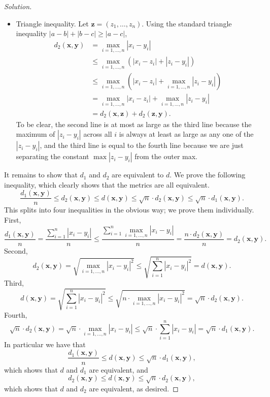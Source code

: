 \documentclass[11pt]{scrartcl}
\providecommand{\ii}{\item}
\theoremstyle{problem}
\theoremstyle{remark}
\newenvironment{soln}{\begin{proof}[Solution]}{\end{proof}}
\begin{document}
\begin{soln}
\begin{itemize}
		\ii Triangle inequality. Let $\mathbf z = (z_1, \dots, z_n)$.
		Using the standard triangle inequality $|a - b| + |b - c| \ge |a - c|$,
		\begin{align*}
			d_2(\mathbf x,\mathbf y) &= \max_{i=1,\dots,n}|x_i - y_i|\\
			&\le \max_{i=1,\dots,n} (|x_i - z_i| + |z_i - y_i|)\\
			&\le \max_{i=1,\dots,n} \left(|x_i - z_i| + \max_{i=1,\dots,n}|z_i - y_i|\right)\\
			&= \max_{i=1,\dots,n} |x_i - z_i|
			+ \max_{i=1,\dots,n}|z_i - y_i|\\
			&= d_2(\mathbf x,\mathbf z) + d_2(\mathbf z,\mathbf y).
		\end{align*}
		To be clear, the second line is at most as large as the third line
		because the maximum of $|z_i - y_i|$ across all $i$
		is always at least as large as any one of the $|z_i - y_i|$,
		and the third line is equal to the fourth line
		because we are just separating the constant $\max |z_i - y_i|$
		from the outer max.
	\end{itemize}

	It remains to show that $d_1$ and $d_2$ are equivalent to $d$.
	We prove the following inequality,
	which clearly shows that the metrics are all equivalent.
	\[
	\frac{d_1(\mathbf x, \mathbf y)}{n} \le
	d_2(\mathbf x, \mathbf y) \le
	d(\mathbf x, \mathbf y) \le
	\sqrt n\cdot d_2(\mathbf x, \mathbf y) \le
	\sqrt n\cdot d_1(\mathbf x, \mathbf y).
	\]
	This splits into four inequalities in the obvious way;
	we prove them individually. First,
	\[\frac{d_1(\mathbf x, \mathbf y)}{n} =
	\frac{\sum_{i=1}^n |x_i - y_i|}{n} \le
	\frac{\sum_{i=1}^n\max_{i=1,\dots,n} |x_i - y_i|}{n}
	= \frac{n\cdot d_2(\mathbf x, \mathbf y)}{n}
	= d_2(\mathbf x, \mathbf y).\]
	Second,
	\[d_2(\mathbf x, \mathbf y) = \sqrt{\max_{i=1,\dots,n} |x_i - y_i|^2}
	\le \sqrt{\sum_{i=1}^n |x_i - y_i|^2} = d(\mathbf x, \mathbf y).\]
	Third,
	\[d(\mathbf x, \mathbf y) = \sqrt{\sum_{i=1}^n |x_i - y_i|^2} \le
	\sqrt{n\cdot \max_{i=1,\dots,n} |x_i - y_i|^2}
	= \sqrt n \cdot d_2(\mathbf x, \mathbf y).\]
	Fourth,
	\[\sqrt n\cdot d_2(\mathbf x, \mathbf y) =
	\sqrt n \cdot \max_{i=1,\dots,n}|x_i - y_i| \le
	\sqrt n \cdot \sum_{i=1}^n |x_i - y_i| =
	\sqrt n \cdot d_1(\mathbf x, \mathbf y).\]
	In particular we have that
	\[\frac{d_1(\mathbf x, \mathbf y)}{n} \le d(\mathbf x, \mathbf y) \le
	\sqrt n\cdot d_1(\mathbf x, \mathbf y),\]
	which shows that $d$ and $d_1$ are equivalent, and
	\[d_2(\mathbf x, \mathbf y) \le d(\mathbf x, \mathbf y) \le
	\sqrt n\cdot d_2(\mathbf x, \mathbf y),\]
	which shows that $d$ and $d_2$ are equivalent, as desired.
\end{soln}
\end{document}

